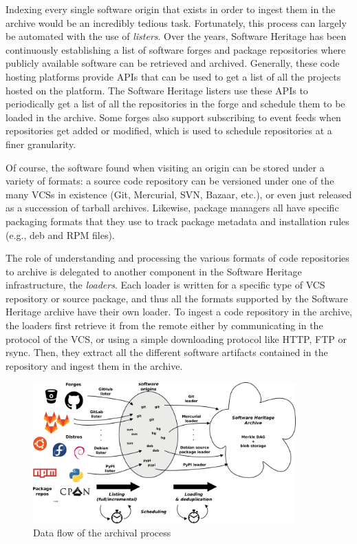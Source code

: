 Indexing every single software origin that exists in order to ingest them in
the archive would be an incredibly tedious task. Fortunately, this process can
largely be automated with the use of \emph{listers}. Over the years, Software
Heritage has been continuously establishing a list of software forges and
package repositories where publicly available software can be retrieved and
archived. Generally, these code hosting platforms provide APIs that can be used
to get a list of all the projects hosted on the platform. The Software Heritage
listers use these APIs to periodically get a list of all the repositories in
the forge and schedule them to be loaded in the archive. Some forges also
support subscribing to event feeds when repositories get added or modified,
which is used to schedule repositories at a finer granularity.

Of course, the software found when visiting an origin can be stored under a
variety of formats: a source code repository can be versioned under one of the
many \glspl{VCS} in existence (Git, Mercurial, SVN, Bazaar, etc.), or even just
released as a succession of tarball archives. Likewise, package managers all
have specific packaging formats that they use to track package metadata and
installation rules (e.g., deb and RPM files).

The role of understanding and processing the various formats of code
repositories to archive is delegated to another component in the Software
Heritage infrastructure, the \emph{loaders}. Each loader is written for a
specific type of \gls{VCS} repository or source package, and thus all the
formats supported by the Software Heritage archive have their own loader. To
ingest a code repository in the archive, the loaders first retrieve it from the
remote either by communicating in the protocol of the VCS, or using a simple
downloading protocol like HTTP, FTP or rsync. Then, they extract all the
different software artifacts contained in the repository and ingest them in the
archive.

\begin{figure}
\begin{center}
    \includegraphics[width=0.9\textwidth]{img/swh-dataflow}
\end{center}
\caption{Data flow of the archival process}%
\label{fig:archival-data-flow}
\end{figure}

